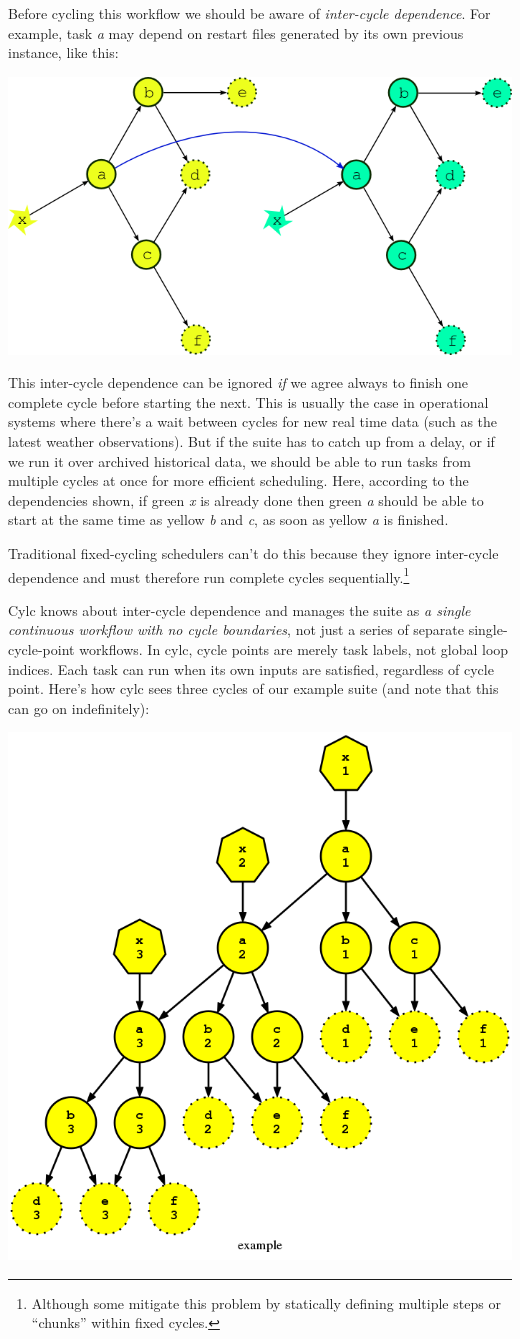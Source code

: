 Before cycling this workflow  we should be aware of {\em inter-cycle
dependence}.  For example, task {\em a} may depend on restart files generated
by its own previous instance, like this:

\begin{center}
    \includegraphics[width=0.5\columnwidth]{resources/tex/dep-two-cycles-linked}
\end{center}

This inter-cycle dependence can be ignored {\em if} we agree always to finish
one complete cycle before starting the next.  This is usually the case in
operational systems where there's a wait between cycles for new real time data
(such as the latest weather observations).  But if the suite has to catch up
from a delay, or if we run it over archived historical data, we should be able
to run tasks from multiple cycles at once for more efficient scheduling.  Here,
according to the dependencies shown, if green {\em x} is already done then
green {\em a} should be able to start at the same time as yellow {\em b}
and {\em c}, as soon as yellow {\em a} is finished.

Traditional fixed-cycling schedulers can't do this because they ignore
inter-cycle dependence and must therefore run complete cycles
sequentially.\footnote{Although some mitigate this problem by statically
defining multiple steps or ``chunks'' within fixed cycles.}

Cylc knows about inter-cycle dependence and manages the suite as {\em a single
continuous workflow with no cycle boundaries}, not just a series of separate
single-cycle-point workflows.  In cylc, cycle points are merely task labels,
not global loop indices.  Each task can run when its own inputs are satisfied,
regardless of cycle point.  Here's how cylc sees three cycles of our example
suite (and note that this can go on indefinitely):

\begin{center}
    \includegraphics[width=0.45\columnwidth]{resources/example-3cycles.png}
\end{center}

